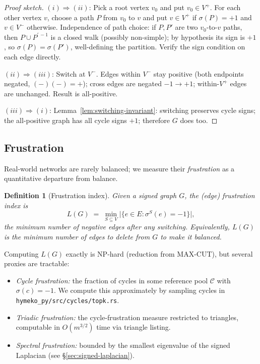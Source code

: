 \documentclass[11pt,a4paper]{article}
\newtheorem{definition}[theorem]{Definition}
\theoremstyle{remark}
\begin{document}
\begin{proof}[Proof sketch]
$(i) \Rightarrow (ii)$: Pick a root vertex $v_0$ and put $v_0 \in
V^+$. For each other vertex $v$, choose a path $P$ from $v_0$ to
$v$ and put $v \in V^+$ if $\sigma(P) = +1$ and $v \in V^-$
otherwise. Independence of path choice: if $P, P'$ are two
$v_0$-to-$v$ paths, then $P \cup P^{\prime\,-1}$ is a closed walk
(possibly non-simple); by hypothesis its sign is $+1$, so
$\sigma(P) = \sigma(P')$, well-defining the partition. Verify the
sign condition on each edge directly.

$(ii) \Rightarrow (iii)$: Switch at $V^-$. Edges within $V^-$
stay positive (both endpoints negated, $(-)(-)=+$); cross edges
are negated $-1 \to +1$; within-$V^+$ edges are unchanged. Result
is all-positive.

$(iii) \Rightarrow (i)$: Lemma~\ref{lem:switching-invariant}:
switching preserves cycle signs; the all-positive graph has all
cycle signs $+1$; therefore $G$ does too.
\end{proof}

\subsection{Frustration}

Real-world networks are rarely balanced; we measure their
\emph{frustration} as a quantitative departure from balance.

\begin{definition}[Frustration index]
Given a signed graph $G$, the \emph{(edge) frustration index} is
\[
  L(G) \;=\; \min_{S \subseteq V}
              \bigl|\bigl\{ e \in E : \sigma^S(e) = -1 \bigr\}\bigr|,
\]
the minimum number of negative edges after any switching.
Equivalently, $L(G)$ is the minimum number of edges to delete
from $G$ to make it balanced.
\end{definition}

Computing $L(G)$ exactly is NP-hard (reduction from MAX-CUT), but
several proxies are tractable:
\begin{itemize}[leftmargin=*]
\item \emph{Cycle frustration:} the fraction of cycles in some
      reference pool $\mathcal{C}$ with $\sigma(c) = -1$. We compute
      this approximately by sampling cycles in
      \texttt{hymeko\_py/src/cycles/topk.rs}.
\item \emph{Triadic frustration:} the cycle-frustration measure
      restricted to triangles, computable in $O(m^{3/2})$ time
      via triangle listing.
\item \emph{Spectral frustration:} bounded by the smallest
      eigenvalue of the signed Laplacian (see \S\ref{sec:signed-laplacian}).
\end{itemize}
\end{document}
